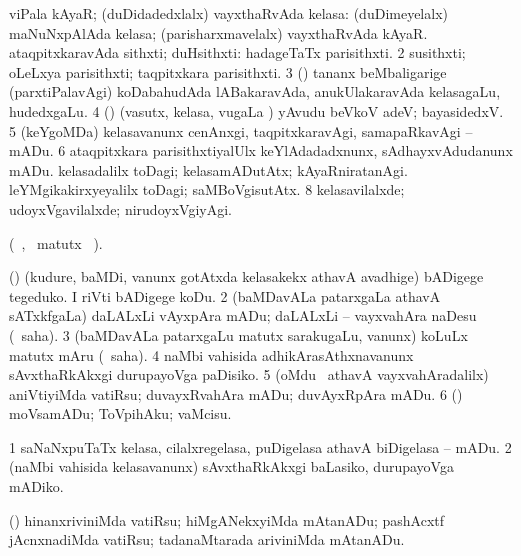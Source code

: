 \noindent
\gl{\nuga}
\bmng
\bnum
{}  
\banum
{} viPala kAyaR; (duDidadedxlalx) vayxthaRvAda kelasa: (duDimeyelalx) maNuNxpAlAda kelasa; (parisharxmavelalx) vayxthaRvAda kAyaR. 
 ataqpitxkaravAda sithxti; duHsithxti: hadageTaTx parisithxti. 
\eanum
\numie
\num{2}  susithxti; oLeLxya parisithxti; taqpitxkara parisithxti. 
\num{3}  (\AmA) tananx beMbaligarige (parxtiPalavAgi) koDabahudAda lABakaravAda, anukUlakaravAda kelasagaLu, hudedxgaLu. 
\num{4}  (\ashi) (vasutx, kelasa, \mo vugaLa \vi) yAvudu beVkoV adeV; bayasidedxV. 
\num{5}  (keYgoMDa) kelasavanunx cenAnxgi, taqpitxkaravAgi, samapaRkavAgi -- mADu. 
\num{6}  ataqpitxkara parisithxtiyalUlx keYlAdadadxnunx, sAdhayxvAdudanunx mADu. 
  
\banum
{} kelasadalilx toDagi; kelasamADutAtx; kAyaRniratanAgi. 
 leYMgikakirxyeyalilx toDagi; saMBoVgisutAtx. 
\eanum
\numie
\num{8}  kelasavilalxde; udoyxVgavilalxde; nirudoyxVgiyAgi. 
\enum
\emng
\eentry

\bentry
{}
\gl{\kirx}
\bmng
(\vakaq\ , \BU\ matutx \BUkaq\ ).
\emng

\noindent
\gl{\sakirx}
\bmng
\bnum
{} (\birx) 
\banum
{} (kudure, baMDi, \mo vanunx gotAtxda kelasakekx athavA avadhige) bADigege tegeduko. 
 I riVti bADigege koDu. 
\eanum
\numie
\num{2} (baMDavALa patarxgaLa athavA sATxkfgaLa) daLALxLi vAyxpAra mADu; daLALxLi -- vayxvahAra naDesu (\akirx\ saha). 
\num{3} (baMDavALa patarxgaLu matutx sarakugaLu, \mo vanunx) koLuLx matutx mAru (\akirx\ saha). 
\num{4} naMbi vahisida adhikArasAthxnavanunx sAvxthaRkAkxgi durupayoVga paDisiko. 
\num{5} (oMdu \vi\ athavA vayxvahAradalilx) aniVtiyiMda vatiRsu; duvayxRvahAra mADu; duvAyxRpAra mADu. 
\num{6} (\ashi) moVsamADu; ToVpihAku; vaMcisu. 
\enum
\emng

\noindent
\gl{\akirx}
\bmng
\bnum
\num{1} saNaNxpuTaTx kelasa, cilalxregelasa, puDigelasa athavA biDigelasa -- mADu. 
\num{2} (naMbi vahisida kelasavanunx) sAvxthaRkAkxgi baLasiko, durupayoVga mADiko. 
\enum
\emng

\noindent
\gl{\nuga}
\bmng
{} (\rUpa) hinanxriviniMda vatiRsu; hiMgANekxyiMda mAtanADu; pashAcxtf jAcnxnadiMda vatiRsu; tadanaMtarada ariviniMda mAtanADu. 
\emng
\eentry

\bentry
{}
\gl{\kirx}
\bmng
\emng

